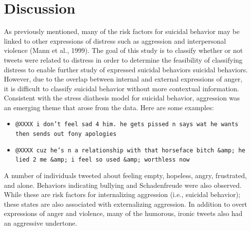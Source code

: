 \documentclass[11pt]{article}
\begin{document}
\section{Discussion}

As previously mentioned, many of the risk factors for suicidal behavior may be linked to other expressions of distress such as aggression and interpersonal violence (Mann et al., 1999).  The goal of this study is to classify whether or not tweets were related to distress in order to determine the feasibility of classifying distress to enable further study of expressed suicidal behaviors suicidal behaviors.  However, due to the overlap between internal and external expressions of anger, it is difficult to classify suicidal behavior without more contextual information.  Consistent with the stress diathesis model for suicidal behavior, aggression was an emerging theme that arose from the data.  Here are some examples:

\begin{itemize}
\footnotesize
\item \texttt{@XXXX i don't feel sad 4 him. he gets pissed n says wat he wants then sends out fony apologies}
\item \texttt{@XXXX cuz he's n a relationship with that horseface bitch \&amp; he lied 2 me \&amp; i feel so used \&amp; worthless now}
\end{itemize}

A number of individuals tweeted about feeling empty, hopeless, angry, frustrated, and alone.  Behaviors indicating bullying and Schadenfreude were also observed. While these are risk factors for internalizing aggression (i.e., suicidal behavior); these states are also associated with externalizing aggression.  In addition to overt expressions of anger and violence, many of the humorous, ironic tweets also had an aggressive undertone. 

\end{document}
